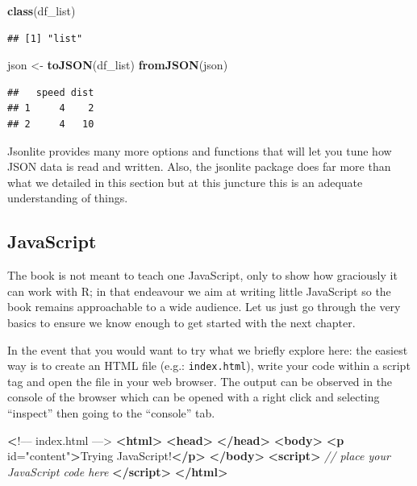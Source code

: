 \documentclass[
]{krantz}
\makeatletter
\newenvironment{Shaded}{\begin{snugshade}}{\end{snugshade}}
\newcommand{\CommentTok}[1]{\textcolor[rgb]{0.37,0.37,0.37}{\textit{#1}}}
\newcommand{\ErrorTok}[1]{\textcolor[rgb]{0.14,0.14,0.14}{\textbf{#1}}}
\newcommand{\KeywordTok}[1]{\textcolor[rgb]{0.27,0.27,0.27}{\textbf{#1}}}
\newcommand{\NormalTok}[1]{#1}
\newcommand{\OtherTok}[1]{\textcolor[rgb]{0.37,0.37,0.37}{#1}}
\newcommand{\StringTok}[1]{\textcolor[rgb]{0.5,0.5,0.5}{#1}}
\newenvironment{kframe}{%
\medskip{}
\setlength{\fboxsep}{.8em}
 \def\at@end@of@kframe{}%
 \ifinner\ifhmode%
  \def\at@end@of@kframe{\end{minipage}}%
  \begin{minipage}{\columnwidth}%
 \fi\fi%
 \def\FrameCommand##1{\hskip\@totalleftmargin \hskip-\fboxsep
 \colorbox{shadecolor}{##1}\hskip-\fboxsep
     \hskip-\linewidth \hskip-\@totalleftmargin \hskip\columnwidth}%
 \MakeFramed {\advance\hsize-\width
   \@totalleftmargin\z@ \linewidth\hsize
   \@setminipage}}%
 {\par\unskip\endMakeFramed%
 \at@end@of@kframe}
\renewenvironment{Shaded}{\begin{kframe}}{\end{kframe}}
\makeatother
\begin{document}
\begin{Shaded}
\begin{Highlighting}[]
\KeywordTok{class}\NormalTok{(df\_list)}
\end{Highlighting}
\end{Shaded}

\begin{verbatim}
## [1] "list"
\end{verbatim}

\begin{Shaded}
\begin{Highlighting}[]
\NormalTok{json \textless{}{-}}\StringTok{ }\KeywordTok{toJSON}\NormalTok{(df\_list)}
\KeywordTok{fromJSON}\NormalTok{(json)}
\end{Highlighting}
\end{Shaded}

\begin{verbatim}
##   speed dist
## 1     4    2
## 2     4   10
\end{verbatim}

Jsonlite provides many more options and functions that will let you tune how JSON data is read and written. Also, the jsonlite package does far more than what we detailed in this section but at this juncture this is an adequate understanding of things.

\hypertarget{javascript}{%
\subsection*{JavaScript}\label{javascript}}


The book is not meant to teach one JavaScript, only to show how graciously it can work with R; in that endeavour we aim at writing little JavaScript so the book remains approachable to a wide audience. Let us just go through the very basics to ensure we know enough to get started with the next chapter.

In the event that you would want to try what we briefly explore here: the easiest way is to create an HTML file (e.g.: \texttt{index.html}), write your code within a script tag and open the file in your web browser. The output can be observed in the console of the browser which can be opened with a right click and selecting ``inspect'' then going to the ``console'' tab.

\begin{Shaded}
\begin{Highlighting}[]
 \ErrorTok{\textless{}}\NormalTok{!–– index.html ––\textgreater{}}
\KeywordTok{\textless{}html\textgreater{}}
  \KeywordTok{\textless{}head\textgreater{}}
  \KeywordTok{\textless{}/head\textgreater{}}
  \KeywordTok{\textless{}body\textgreater{}}
    \KeywordTok{\textless{}p}\OtherTok{ id=}\StringTok{"content"}\KeywordTok{\textgreater{}}\NormalTok{Trying JavaScript!}\KeywordTok{\textless{}/p\textgreater{}}
  \KeywordTok{\textless{}/body\textgreater{}}
  \KeywordTok{\textless{}script\textgreater{}}
    \CommentTok{// place your JavaScript code here}
  \KeywordTok{\textless{}/script\textgreater{}}
\KeywordTok{\textless{}/html\textgreater{}}
\end{Highlighting}
\end{Shaded}
\end{document}

